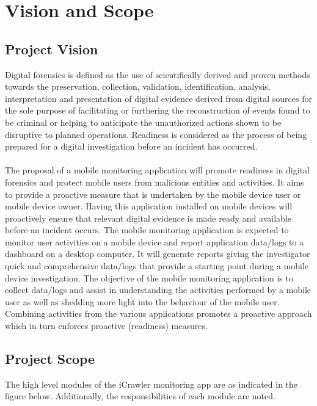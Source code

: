 \documentclass[hidelinks, 12pt, oneside]{article}
\begin{document}
	
	\tableofcontents
	
	\newpage
	\section{Vision and Scope}
		\subsection{Project Vision}
		\vspace{0.3 cm}
	  	Digital forensics is defined as the use of scientifically derived and proven methods towards the preservation, 			collection, validation, identification, analysis, interpretation and presentation of digital evidence derived 			from digital sources for the sole purpose of facilitating or furthering the reconstruction of events found to 			be criminal or helping to anticipate the unauthorized actions shown to be disruptive to planned operations.
		Readiness is considered as the process of being prepared for a digital investigation before an incident has 			occurred. \\\\
		The proposal of a mobile monitoring application will promote readiness in digital forensics and protect mobile 			users from malicious entities and activities. It aims to provide a proactive measure that is undertaken by the 		mobile device user or mobile device owner. Having this application installed on mobile devices will proactively 		ensure that relevant digital evidence is made ready and available before an incident occurs. The mobile 				monitoring application is expected to monitor user activities on a mobile device and report application data/logs to a dashboard on a desktop computer. It will generate reports giving the investigator quick and 					comprehensive data/logs that provide a starting point during a mobile device investigation. \newline\newline
		The objective of the mobile monitoring application is to collect data/logs and assist in understanding the 				activities performed by a mobile user as well as shedding more light into the behaviour of the mobile user. 			Combining activities from the various applications promotes a proactive approach which in turn enforces 				proactive (readiness) measures.
		
		\newpage
		\subsection{Project Scope}	
		The high level modules of the iCrawler monitoring app are as indicated in the figure below. Additionally, the responsibilities of each module are noted.
		
\end{document}
